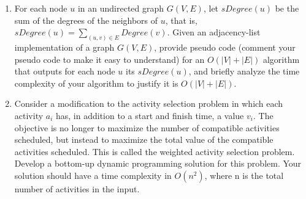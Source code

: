 \documentclass{article}
\begin{document}
\begin{enumerate}
\begin{center}
            \end{center}
        \item For each node $u$ in an undirected graph $G(V, E)$, let 
        $sDegree(u)$ be the sum of the degrees of the neighbors of $u$, that 
        is, $sDegree(u) = \sum_{(u,v)\in E}Degree(v)$. Given an adjacency-list 
        implementation of a graph $G(V, E)$, provide pseudo code (comment your 
        pseudo code to make it easy to understand) for an $O(|V|+|E|)$ 
        algorithm that outputs for each node $u$ its $sDegree(u)$, and briefly 
        analyze the time complexity of your algorithm to justify it is 
        $O(|V|+|E|)$.
        \item Consider a modification to the activity selection problem in 
        which each activity $a_i$ has, in addition to a start and finish time, 
        a value $v_i$. The objective is no longer to maximize the number of 
        compatible activities scheduled, but instead to maximize the total 
        value of the compatible activities scheduled. This is called the 
        weighted activity selection problem. Develop a bottom-up dynamic 
        programming solution for this problem. Your solution should have a 
        time complexity in $O(n^2)$, where n is the total number of activities 
        in the input.
    \end{enumerate}
\end{document}
